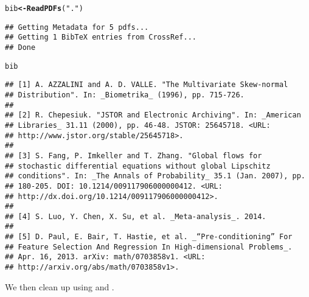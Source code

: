 \documentclass[article]{jss}\usepackage[]{graphicx}\usepackage[]{color}
\makeatletter
\newcommand{\hlstr}[1]{\textcolor[rgb]{0.125,0.125,1}{#1}}%
\newcommand{\hlstd}[1]{\textcolor[rgb]{0.251,0.251,0.282}{#1}}%
\newcommand{\hlkwb}[1]{\textcolor[rgb]{0.439,0.251,1}{\textbf{#1}}}%
\newcommand{\hlkwd}[1]{\textcolor[rgb]{0.251,0.251,0.282}{\textbf{#1}}}%
\newenvironment{kframe}{%
 \def\at@end@of@kframe{}%
 \ifinner\ifhmode%
  \def\at@end@of@kframe{\end{minipage}}%
  \begin{minipage}{\columnwidth}%
 \fi\fi%
 \def\FrameCommand##1{\hskip\@totalleftmargin \hskip-\fboxsep
 \colorbox{shadecolor}{##1}\hskip-\fboxsep
     \hskip-\linewidth \hskip-\@totalleftmargin \hskip\columnwidth}%
 \MakeFramed {\advance\hsize-\width
   \@totalleftmargin\z@ \linewidth\hsize
   \@setminipage}}%
 {\par\unskip\endMakeFramed%
 \at@end@of@kframe}
\newenvironment{knitrout}{}{} %
\makeatother
\begin{document}
\begin{knitrout}
\color{fgcolor}\begin{kframe}
\begin{alltt}
\hlstd{bib} \hlkwb{<-} \hlkwd{ReadPDFs}\hlstd{(}\hlstr{"."}\hlstd{)}
\end{alltt}
\begin{lstlisting}
## Getting Metadata for 5 pdfs...
## Getting 1 BibTeX entries from CrossRef...
## Done
\end{lstlisting}\begin{alltt}
\hlstd{bib}
\end{alltt}
\begin{verbatim}
## [1] A. AZZALINI and A. D. VALLE. "The Multivariate Skew-normal
## Distribution". In: _Biometrika_ (1996), pp. 715-726.
## 
## [2] R. Chepesiuk. "JSTOR and Electronic Archiving". In: _American
## Libraries_ 31.11 (2000), pp. 46-48. JSTOR: 25645718. <URL:
## http://www.jstor.org/stable/25645718>.
## 
## [3] S. Fang, P. Imkeller and T. Zhang. "Global flows for
## stochastic differential equations without global Lipschitz
## conditions". In: _The Annals of Probability_ 35.1 (Jan. 2007), pp.
## 180-205. DOI: 10.1214/009117906000000412. <URL:
## http://dx.doi.org/10.1214/009117906000000412>.
## 
## [4] S. Luo, Y. Chen, X. Su, et al. _Meta-analysis_. 2014.
## 
## [5] D. Paul, E. Bair, T. Hastie, et al. _“Pre-conditioning” For
## Feature Selection And Regression In High-dimensional Problems_.
## Apr. 16, 2013. arXiv: math/0703858v1. <URL:
## http://arxiv.org/abs/math/0703858v1>.
\end{verbatim}
\end{kframe}
\end{knitrout}

We then clean up using  and .
\end{document}
